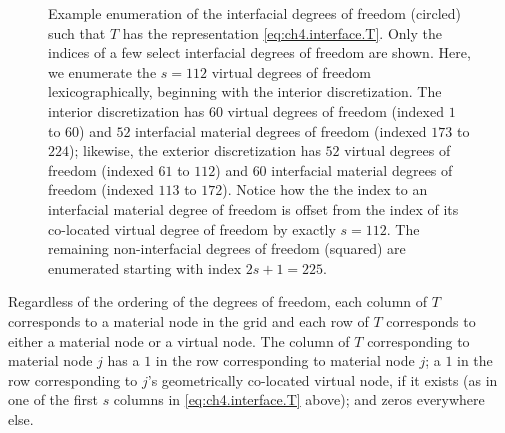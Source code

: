 \setlength{\figureheight}{0.40\columnwidth}
\begin{figure}[htbp]
\begin{center}
\caption{Example enumeration of the interfacial degrees of freedom (circled) such that $T$ has the representation \eqref{eq:ch4.interface.T}. Only the indices of a few select interfacial degrees of freedom are shown. Here, we enumerate the $s = 112$ virtual degrees of freedom lexicographically, beginning with the interior discretization. The interior discretization has $60$ virtual degrees of freedom (indexed $1$ to $60$) and $52$ interfacial material degrees of freedom (indexed $173$ to $224$); likewise, the exterior discretization has $52$ virtual degrees of freedom (indexed $61$ to $112$) and $60$ interfacial material degrees of freedom (indexed $113$ to $172$). Notice how the the index to an interfacial material degree of freedom is offset from the index of its co-located virtual degree of freedom by exactly $s = 112$. The remaining non-interfacial degrees of freedom (squared) are enumerated starting with index $2s + 1 = 225$.}
\label{fig:ch4.dofenumerationforT}
\end{center}
\end{figure}

Regardless of the ordering of the degrees of freedom, each column of $T$ corresponds to a material node in the grid and each row of $T$ corresponds to either a material node or a virtual node. The column of $T$ corresponding to material node $j$ has a $1$ in the row corresponding to material node $j$; a $1$ in the row corresponding to $j$'s geometrically co-located virtual node, if it exists (as in one of the first $s$ columns in \eqref{eq:ch4.interface.T} above); and zeros everywhere else.

